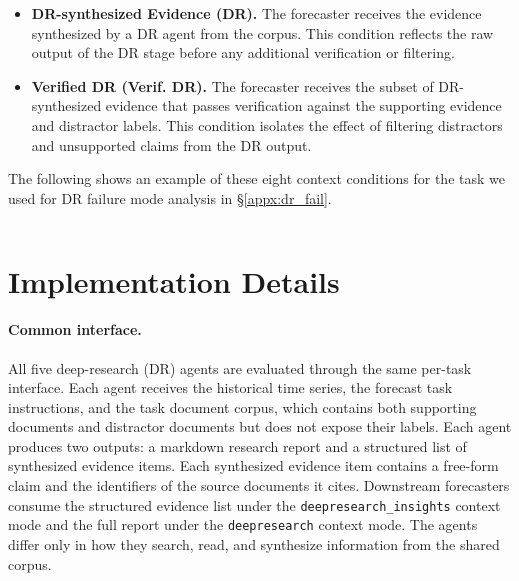 \documentclass[]{servicenow}
\begin{document}
\begin{itemize}[leftmargin=*, itemsep=0.2em, topsep=0.2em, parsep=0pt, partopsep=0pt]
    \item \textbf{DR-synthesized Evidence (DR).} The forecaster receives the evidence synthesized by a DR agent from the corpus. This condition reflects the raw output of the DR stage before any additional verification or filtering.

    \item \textbf{Verified DR (Verif. DR).} The forecaster receives the subset of DR-synthesized evidence that passes verification against the supporting evidence and distractor labels. This condition isolates the effect of filtering distractors and unsupported claims from the DR output.
\end{itemize}

The following shows an example of these eight context conditions for the task we used for DR failure mode analysis in \S\ref{appx:dr_fail}.

\begin{tcolorbox}[title=Example context conditions, breakable]
\inputminted[fontsize=\scriptsize, breaklines, breaksymbolleft={}, breaksymbolright={}]{markdown}{context_mode.txt}
\end{tcolorbox}


\section{Implementation Details}
\label{app:experimental-setup}

\paragraph{Common interface.}
All five deep-research (DR) agents are evaluated through the same per-task interface.
Each agent receives the historical time series, the forecast task instructions, and the task document corpus, which contains both supporting documents and distractor documents but does not expose their labels.
Each agent produces two outputs: a markdown research report and a structured list of synthesized evidence items.
Each synthesized evidence item contains a free-form claim and the identifiers of the source documents it cites.
Downstream forecasters consume the structured evidence list under the \texttt{deepresearch\_insights} context mode and the full report under the \texttt{deepresearch} context mode.
The agents differ only in how they search, read, and synthesize information from the shared corpus.
\end{document}
